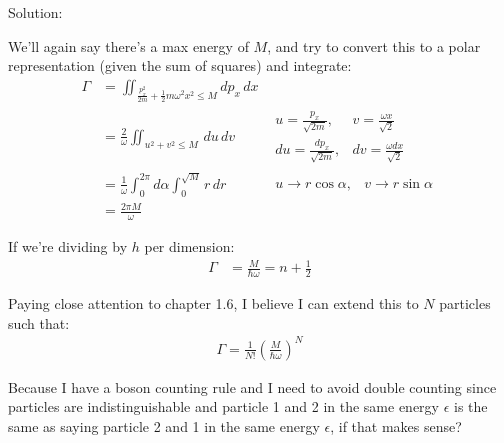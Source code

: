 \begin{homeworkProblem}
\begin{callout}{Solution:}
\begin{enumerate}[(i)]
            We'll again say there's a max energy of $M$, and try to convert this to a polar representation (given the sum of squares) and integrate:
            \begin{align*}
                \Gamma &= \iint_{\frac{p_x^{2}}{2m} + \frac{1}{2}m\omega^{2} x^{2} \leq M} dp_x\,dx \\
                       &= \frac{2}{\omega} \iint_{u^{2}+v^{2} \leq M}^{} \,du\,dv 
                       &\begin{matrix}
                           u = \frac{p_x}{\sqrt{2m}},& v=\frac{\omega x}{\sqrt{2}} \\ 
                           du = \frac{dp_x}{\sqrt{2m}}, & dv= \frac{\omega dx}{\sqrt{2}}
                       \end{matrix} \\
                       &= \frac{1}{\omega} \int_{0}^{2\pi} d \alpha \int_{0}^{\sqrt{M}} r \,dr & 
                       \begin{matrix}
                           u \to r \cos \alpha, & v \to r \sin \alpha
                       \end{matrix} \\ 
                       &= \frac{2\pi M}{\omega}
            \end{align*}

            If we're dividing by $h$ per dimension:
            \begin{align*}
                \Gamma &= \frac{M}{\hbar \omega} = n + \frac{1}{2}
            \end{align*}

            Paying close attention to chapter 1.6, I believe I can extend this to $N$ particles such that:
            \begin{align*}
                \Gamma = \frac{1}{N!} \left( \frac{M}{\hbar \omega} \right)^{N}
            \end{align*}

            Because I have a boson counting rule and I need to avoid double counting since particles are indistinguishable and particle 1 and 2 in the same energy $\epsilon$ is the same as saying particle 2 and 1 in the same energy $\epsilon$, if that makes sense?

    \end{enumerate}

    \end{callout}

\end{homeworkProblem}

